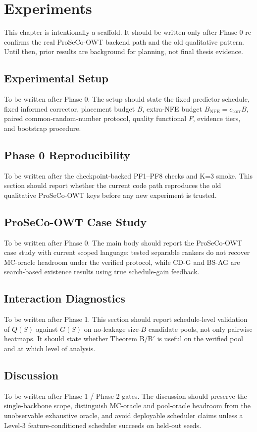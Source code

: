 \chapter{Experiments}
\label{ch:experiments}

This chapter is intentionally a scaffold. It should be written only after
Phase 0 re-confirms the real ProSeCo-OWT backend path and the old qualitative
pattern. Until then, prior results are background for planning, not final
thesis evidence.

\section{Experimental Setup}
\label{sec:exp-setup}

To be written after Phase 0. The setup should state the fixed predictor
schedule, fixed informed corrector, placement budget $B$, extra-NFE budget
$B_{\mathrm{NFE}} = c_{\mathrm{corr}}B$, paired common-random-number protocol,
quality functional $F$, evidence tiers, and bootstrap procedure.

\section{Phase 0 Reproducibility}
\label{sec:exp-phase0}

To be written after the checkpoint-backed PF1--PF8 checks and K=3 smoke.
This section should report whether the current code path reproduces the old
qualitative ProSeCo-OWT keys before any new experiment is trusted.

\section{ProSeCo-OWT Case Study}
\label{sec:exp-proseco-owt}

To be written after Phase 0. The main body should report the ProSeCo-OWT
case study with current scoped language: tested separable rankers do not
recover MC-oracle headroom under the verified protocol, while CD-G and BS-AG
are search-based existence results using true schedule-gain feedback.

\section{Interaction Diagnostics}
\label{sec:exp-interaction-diagnostics}

To be written after Phase 1. This section should report schedule-level
validation of $Q(S)$ against $G(S)$ on no-leakage size-$B$ candidate pools,
not only pairwise heatmaps. It should state whether Theorem B/B$'$ is useful
on the verified pool and at which level of analysis.

\section{Discussion}
\label{sec:exp-discussion}

To be written after Phase 1 / Phase 2 gates. The discussion should preserve
the single-backbone scope, distinguish MC-oracle and pool-oracle headroom from
the unobservable exhaustive oracle, and avoid deployable scheduler claims
unless a Level-3 feature-conditioned scheduler succeeds on held-out seeds.
